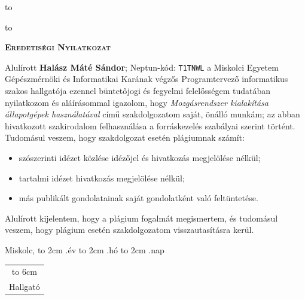

\vskip 2cm

\hbox to 

\hbox to 

\newpage

\vspace*{1cm}  
\begin{center}
\large\textsc{\bfseries Eredetiségi Nyilatkozat}
\end{center}
\vspace*{2cm}  

Alulírott \textbf{Halász Máté Sándor}; Neptun-kód: \texttt{T1TNWL} a Miskolci Egyetem Gépészmérnöki és Informatikai Karának végzős Programtervező informatikus szakos hallgatója ezennel büntetőjogi és fegyelmi felelősségem tudatában nyilatkozom és aláírásommal igazolom, hogy \textit{Mozgásrendszer kialakítása állapotgépek használatával}
című szakdolgozatom saját, önálló munkám; az abban hivatkozott szakirodalom
felhasználása a forráskezelés szabályai szerint történt.\\

Tudomásul veszem, hogy szakdolgozat esetén plágiumnak számít:
\begin{itemize}
\item szószerinti idézet közlése idézőjel és hivatkozás megjelölése nélkül;
\item tartalmi idézet hivatkozás megjelölése nélkül;
\item más publikált gondolatainak saját gondolatként való feltüntetése.
\end{itemize}

Alulírott kijelentem, hogy a plágium fogalmát megismertem, és tudomásul veszem, hogy
plágium esetén szakdolgozatom visszautasításra kerül.

\vspace*{3cm}

\noindent Miskolc, \hbox to 2cm{\dotfill} .év \hbox to 2cm{\dotfill} .hó \hbox to 2cm{\dotfill} .nap

\vspace*{3cm}

\hspace*{8cm}\begin{tabular}{c}
\hbox to 6cm{\dotfill}\\
Hallgató
\end{tabular}



